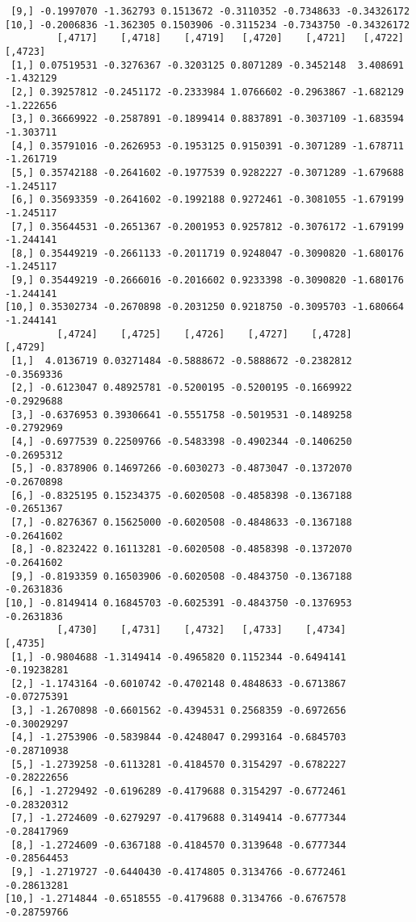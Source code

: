 \documentclass[
  letterpaper,
  DIV=11,
  numbers=noendperiod]{scrreprt}
\begin{document}
\begin{verbatim}
 [9,] -0.1997070 -1.362793 0.1513672 -0.3110352 -0.7348633 -0.34326172
[10,] -0.2006836 -1.362305 0.1503906 -0.3115234 -0.7343750 -0.34326172
         [,4717]    [,4718]    [,4719]   [,4720]    [,4721]   [,4722]   [,4723]
 [1,] 0.07519531 -0.3276367 -0.3203125 0.8071289 -0.3452148  3.408691 -1.432129
 [2,] 0.39257812 -0.2451172 -0.2333984 1.0766602 -0.2963867 -1.682129 -1.222656
 [3,] 0.36669922 -0.2587891 -0.1899414 0.8837891 -0.3037109 -1.683594 -1.303711
 [4,] 0.35791016 -0.2626953 -0.1953125 0.9150391 -0.3071289 -1.678711 -1.261719
 [5,] 0.35742188 -0.2641602 -0.1977539 0.9282227 -0.3071289 -1.679688 -1.245117
 [6,] 0.35693359 -0.2641602 -0.1992188 0.9272461 -0.3081055 -1.679199 -1.245117
 [7,] 0.35644531 -0.2651367 -0.2001953 0.9257812 -0.3076172 -1.679199 -1.244141
 [8,] 0.35449219 -0.2661133 -0.2011719 0.9248047 -0.3090820 -1.680176 -1.245117
 [9,] 0.35449219 -0.2666016 -0.2016602 0.9233398 -0.3090820 -1.680176 -1.244141
[10,] 0.35302734 -0.2670898 -0.2031250 0.9218750 -0.3095703 -1.680664 -1.244141
         [,4724]    [,4725]    [,4726]    [,4727]    [,4728]    [,4729]
 [1,]  4.0136719 0.03271484 -0.5888672 -0.5888672 -0.2382812 -0.3569336
 [2,] -0.6123047 0.48925781 -0.5200195 -0.5200195 -0.1669922 -0.2929688
 [3,] -0.6376953 0.39306641 -0.5551758 -0.5019531 -0.1489258 -0.2792969
 [4,] -0.6977539 0.22509766 -0.5483398 -0.4902344 -0.1406250 -0.2695312
 [5,] -0.8378906 0.14697266 -0.6030273 -0.4873047 -0.1372070 -0.2670898
 [6,] -0.8325195 0.15234375 -0.6020508 -0.4858398 -0.1367188 -0.2651367
 [7,] -0.8276367 0.15625000 -0.6020508 -0.4848633 -0.1367188 -0.2641602
 [8,] -0.8232422 0.16113281 -0.6020508 -0.4858398 -0.1372070 -0.2641602
 [9,] -0.8193359 0.16503906 -0.6020508 -0.4843750 -0.1367188 -0.2631836
[10,] -0.8149414 0.16845703 -0.6025391 -0.4843750 -0.1376953 -0.2631836
         [,4730]    [,4731]    [,4732]   [,4733]    [,4734]     [,4735]
 [1,] -0.9804688 -1.3149414 -0.4965820 0.1152344 -0.6494141 -0.19238281
 [2,] -1.1743164 -0.6010742 -0.4702148 0.4848633 -0.6713867 -0.07275391
 [3,] -1.2670898 -0.6601562 -0.4394531 0.2568359 -0.6972656 -0.30029297
 [4,] -1.2753906 -0.5839844 -0.4248047 0.2993164 -0.6845703 -0.28710938
 [5,] -1.2739258 -0.6113281 -0.4184570 0.3154297 -0.6782227 -0.28222656
 [6,] -1.2729492 -0.6196289 -0.4179688 0.3154297 -0.6772461 -0.28320312
 [7,] -1.2724609 -0.6279297 -0.4179688 0.3149414 -0.6777344 -0.28417969
 [8,] -1.2724609 -0.6367188 -0.4184570 0.3139648 -0.6777344 -0.28564453
 [9,] -1.2719727 -0.6440430 -0.4174805 0.3134766 -0.6772461 -0.28613281
[10,] -1.2714844 -0.6518555 -0.4179688 0.3134766 -0.6767578 -0.28759766

\end{verbatim}
\end{document}
